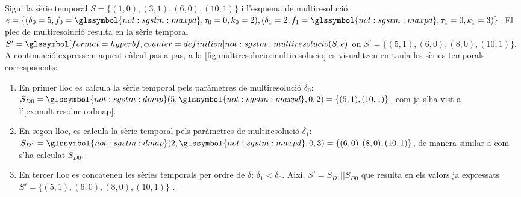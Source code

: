 \begin{example}
  Sigui la sèrie temporal $S=\{(1,0),(3,1),(6,0),(10,1)\}$ i l'esquema
  de multiresolució
  $e=\{(\delta_0=5,f_0=\glssymbol{not:sgstm:maxpd},\tau_0=0,k_0=2),
  (\delta_1=2,f_1=\glssymbol{not:sgstm:maxpd},\tau_1=0,k_1=3)\}$.  El
  plec de multiresolució resulta en la sèrie temporal $S'=
  \glssymboldef{not:sgstm:multiresolucio}(S,e)$ on
  $S'=\{(5,1),(6,0),(8,0),(10,1)\}$. A continuació expressem aquest
  càlcul pas a pas, a la \autoref{fig:multiresolucio:multiresolucio}
  es visualitzen en taula les sèries temporals corresponents:

  \begin{enumerate}
  \item En primer lloc es calcula la sèrie temporal pels paràmetres de
    multiresolució $\delta_0$:
    $S_{D0}=\glssymbol{not:sgstm:dmap}(5,\glssymbol{not:sgstm:maxpd},0,2)=\{(5,1),(10,1)\}$,
    com ja s'ha vist a l'\autoref{ex:multiresolucio:dmap}.

  \item En segon lloc, es calcula la sèrie temporal pels paràmetres de
    multiresolució $\delta_1$:
    $S_{D1}=\glssymbol{not:sgstm:dmap}(2,\glssymbol{not:sgstm:maxpd},0,3)=\{(6,0),(8,0),(10,1)\}$,
    de manera similar a com s'ha calculat $S_{D0}$.

  \item En tercer lloc es concatenen les sèries temporals per ordre de
    $\delta$: $\delta_1<\delta_0$. Així, $S'= S_{D1} || S_{D0}$ que
    resulta en els valors ja expressats
    $S'=\{(5,1),(6,0),(8,0),(10,1)\}$ .

  \end{enumerate}
  



\end{example}
